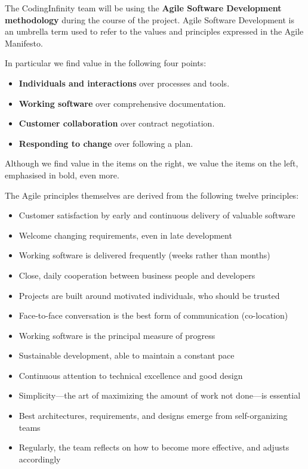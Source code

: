 The CodingInfinity team will be using the \textbf{Agile Software Development methodology} during the course of the project. Agile Software Development is an umbrella term used to refer to the values and principles expressed in the Agile Manifesto.

In particular we find value in the following four points:
\begin{itemize}
	\item \textbf{Individuals and interactions} over processes and tools.
	\item \textbf{Working software} over comprehensive documentation.
	\item \textbf{Customer collaboration} over contract negotiation.
	\item \textbf{Responding to change} over following a plan.
\end{itemize}

Although we find value in the items on the right, we value the items on the left, emphasised in bold, even more.

The Agile principles themselves are derived from the following twelve principles:
\begin{itemize}
  \item Customer satisfaction by early and continuous delivery of valuable software
  \item Welcome changing requirements, even in late development
  \item Working software is delivered frequently (weeks rather than months)
  \item Close, daily cooperation between business people and developers
  \item Projects are built around motivated individuals, who should be trusted
  \item Face-to-face conversation is the best form of communication (co-location)
  \item Working software is the principal measure of progress
  \item Sustainable development, able to maintain a constant pace
  \item Continuous attention to technical excellence and good design
  \item Simplicity—the art of maximizing the amount of work not done—is essential
  \item Best architectures, requirements, and designs emerge from self-organizing teams
  \item Regularly, the team reflects on how to become more effective, and adjusts accordingly
\end{itemize}

